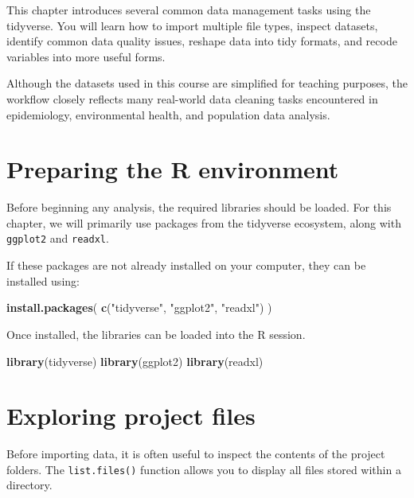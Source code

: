 \documentclass[
  11pt,
  oneside]{book}
\newenvironment{Shaded}{\begin{snugshade}}{\end{snugshade}}
\newcommand{\FunctionTok}[1]{\textcolor[rgb]{0.13,0.29,0.53}{\textbf{#1}}}
\newcommand{\NormalTok}[1]{#1}
\newcommand{\StringTok}[1]{\textcolor[rgb]{0.31,0.60,0.02}{#1}}
\begin{document}
This chapter introduces several common data management tasks using the tidyverse. You will learn how to import multiple file types, inspect datasets, identify common data quality issues, reshape data into tidy formats, and recode variables into more useful forms.

Although the datasets used in this course are simplified for teaching purposes, the workflow closely reflects many real-world data cleaning tasks encountered in epidemiology, environmental health, and population data analysis.

\section{Preparing the R environment}\label{preparing-the-r-environment}

Before beginning any analysis, the required libraries should be loaded. For this chapter, we will primarily use packages from the tidyverse ecosystem, along with \texttt{ggplot2} and \texttt{readxl}.

If these packages are not already installed on your computer, they can be installed using:

\begin{Shaded}
\begin{Highlighting}[]
\FunctionTok{install.packages}\NormalTok{(}
  \FunctionTok{c}\NormalTok{(}\StringTok{"tidyverse"}\NormalTok{, }\StringTok{"ggplot2"}\NormalTok{, }\StringTok{"readxl"}\NormalTok{)}
\NormalTok{)}
\end{Highlighting}
\end{Shaded}

Once installed, the libraries can be loaded into the R session.

\begin{Shaded}
\begin{Highlighting}[]
\FunctionTok{library}\NormalTok{(tidyverse)}
\FunctionTok{library}\NormalTok{(ggplot2)}
\FunctionTok{library}\NormalTok{(readxl)}
\end{Highlighting}
\end{Shaded}

\section{Exploring project files}\label{exploring-project-files}

Before importing data, it is often useful to inspect the contents of the project folders. The \texttt{list.files()} function allows you to display all files stored within a directory.
\end{document}
